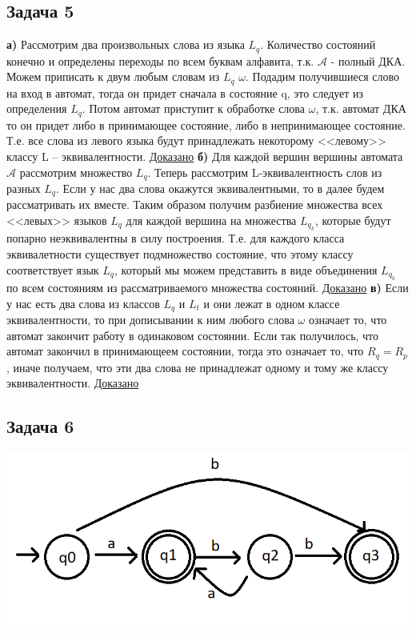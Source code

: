 \documentclass[a4paper,14pt]{article} %
\begin{document}
\subsection{Задача 5}
\textbf{а)} Рассмотрим два произвольных слова из языка $L_q$. Количество состояний конечно и определены переходы по всем буквам алфавита, т.к. $\mathcal{A}$ - полный ДКА. 
Можем приписать к двум любым словам из $L_q$ $\omega$. Подадим получившиеся слово на вход в автомат, тогда он придет сначала в состояние q, это следует из определения $L_q$.
Потом автомат приступит к обработке слова $\omega$, т.к. автомат ДКА то он придет либо в принимающее состояние, либо в непринимающее состояние.
Т.е. все слова из левого языка будут принадлежать некоторому <<левому>> классу L -- эквивалентности.
\newline
\underline{Доказано}
\newline
\textbf{б)} Для каждой вершин вершины автомата $\mathcal{A}$ рассмотрим множество $L_q$.
Теперь рассмотрим L-эквивалентность слов из разных $L_q$. Если у нас два слова окажутся эквивалентными, то в далее будем рассматривать их вместе.
Таким образом получим разбиение множества всех <<левых>> языков $L_q$ для каждой вершина на множества $L_{q_k}$, которые будут попарно неэквивалентны в силу построения.
Т.е. для каждого класса эквивалетности существует подмножество состояние, что этому классу соответствует язык $L_q$, который мы можем представить в виде объединения $L_{q_k}$ по всем состояниям из рассматриваемого множества состояний.
\newline
\underline{Доказано}
\newline
\textbf{в)} Если у нас есть два слова из классов $L_q$ и $L_t$ и они лежат в одном классе эквивалентности, то при дописывании
к ним любого слова $\omega$ означает то, что автомат закончит работу в одинаковом состоянии. Если так получилось, что автомат закончил в принимающеем состоянии, тогда
это означает то, что $R_q = R_p$, иначе получаем, что эти два слова не принадлежат одному и тому же классу эквивалентности.
\newline
\underline{Доказано}

\subsection{Задача 6}

\includegraphics[scale=0.7]{05.png}
\end{document}
